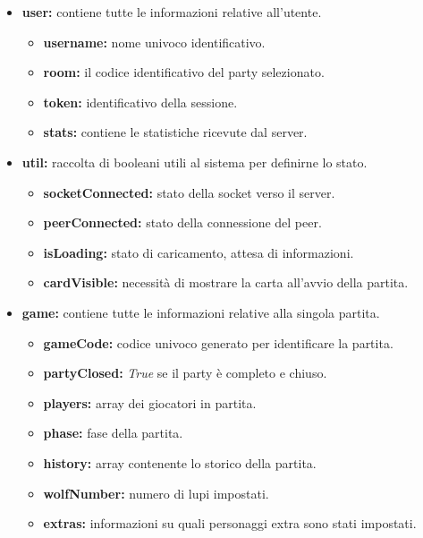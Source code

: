 \begin{itemize}
    \item \textbf{user:} contiene tutte le informazioni relative all'utente.
        \begin{itemize}
            \item \textbf{username:} nome univoco identificativo.
            \item \textbf{room:} il codice identificativo del party selezionato.
            \item \textbf{token:} identificativo della sessione.
            \item \textbf{stats:} contiene le statistiche ricevute dal server.
        \end{itemize}
    \item \textbf{util:} raccolta di booleani utili al sistema per definirne lo stato.
        \begin{itemize}
            \item \textbf{socketConnected:} stato della socket verso il server.
            \item \textbf{peerConnected:} stato della connessione del peer.
            \item \textbf{isLoading:} stato di caricamento, attesa di informazioni.
            \item \textbf{cardVisible:} necessità di mostrare la carta all'avvio della partita.
        \end{itemize}
    \item \textbf{game:} contiene tutte le informazioni relative alla singola partita.
        \begin{itemize}
            \item \textbf{gameCode:} codice univoco generato per identificare la partita.
            \item \textbf{partyClosed:} \emph{True} se il party è completo e chiuso.
            \item \textbf{players:} array dei giocatori in partita.
            \item \textbf{phase:} fase della partita.
            \item \textbf{history:} array contenente lo storico della partita.
            \item \textbf{wolfNumber:} numero di lupi impostati.
            \item \textbf{extras:} informazioni su quali personaggi extra sono stati impostati.
        \end{itemize}
\end{itemize}

